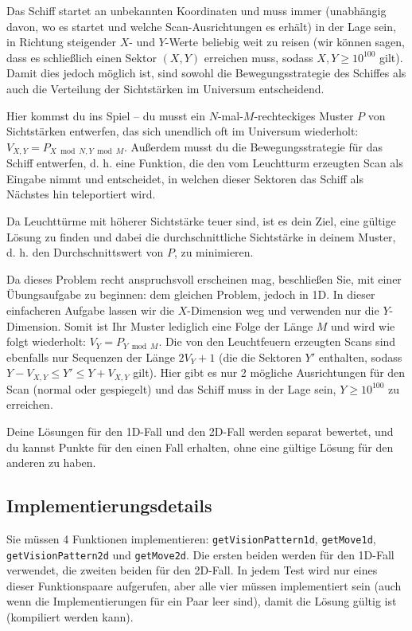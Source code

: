 \documentclass[12pt]{article}
\begin{document}
Das Schiff startet an unbekannten Koordinaten und muss immer (unabhängig davon, wo es startet und welche Scan-Ausrichtungen es erhält) in der Lage sein, in Richtung steigender $X$- und $Y$-Werte beliebig weit zu reisen (wir können sagen, dass es schließlich einen Sektor $(X, Y)$ erreichen muss, sodass $X, Y \geq 10^{100}$ gilt). Damit dies jedoch möglich ist, sind sowohl die Bewegungsstrategie des Schiffes als auch die Verteilung der Sichtstärken im Universum entscheidend.

Hier kommst du ins Spiel – du musst ein $N$-mal-$M$-rechteckiges Muster $P$ von Sichtstärken entwerfen, das sich unendlich oft im Universum wiederholt: $V_{X, Y} = P_{X \bmod N, Y \bmod M}$. Außerdem musst du die Bewegungsstrategie für das Schiff entwerfen, d. h. eine Funktion, die den vom Leuchtturm erzeugten Scan als Eingabe nimmt und entscheidet, in welchen dieser Sektoren das Schiff als Nächstes hin teleportiert wird.

Da Leuchttürme mit höherer Sichtstärke teuer sind, ist es dein Ziel, eine gültige Lösung zu finden und dabei die durchschnittliche Sichtstärke in deinem Muster, d. h. den Durchschnittswert von $P$, zu minimieren.

Da dieses Problem recht anspruchsvoll erscheinen mag, beschließen Sie, mit einer Übungsaufgabe zu beginnen: dem gleichen Problem, jedoch in 1D. In dieser einfacheren Aufgabe lassen wir die $X$-Dimension weg und verwenden nur die $Y$-Dimension. Somit ist Ihr Muster lediglich eine Folge der Länge $M$ und wird wie folgt wiederholt: $V_Y = P_{Y \bmod M}$. Die von den Leuchtfeuern erzeugten Scans sind ebenfalls nur Sequenzen der Länge $2V_Y + 1$ (die die Sektoren $Y'$ enthalten, sodass  $Y - V_{X, Y} \leq Y' \leq Y + V_{X, Y}$ gilt). Hier gibt es nur 2 mögliche Ausrichtungen für den Scan (normal oder gespiegelt) und das Schiff muss in der Lage sein, $Y \geq 10^{100}$ zu erreichen.

Deine Lösungen für den 1D-Fall und den 2D-Fall werden separat bewertet, und du kannst Punkte für den einen Fall erhalten, ohne eine gültige Lösung für den anderen zu haben.

\subsection{Implementierungsdetails}

Sie müssen 4 Funktionen implementieren: \verb|getVisionPattern1d|, \verb|getMove1d|, \verb|getVisionPattern2d| und \verb|getMove2d|. Die ersten beiden werden für den 1D-Fall verwendet, die zweiten beiden für den 2D-Fall. In jedem Test wird nur eines dieser Funktionspaare aufgerufen, aber alle vier müssen implementiert sein (auch wenn die Implementierungen für ein Paar leer sind), damit die Lösung gültig ist (kompiliert werden kann).
\end{document}
